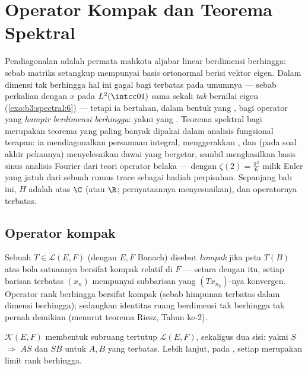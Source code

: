 \chapter{Operator Kompak dan Teorema Spektral}
\label{ch:b3:spectral}

Pendiagonalan adalah permata mahkota aljabar linear berdimensi
berhingga: sebab matriks setangkup mempunyai basis ortonormal berisi
vektor eigen. Dalam dimensi tak berhingga hal ini gagal bagi  terbatas pada umumnya --- sebab perkalian dengan $x$ pada
$L^2(\intcc01)$ sama sekali \emph{tak} bernilai eigen
(\cref{exo:b3:spectral:6}) --- tetapi ia bertahan, dalam bentuk
yang , bagi operator yang \emph{hampir berdimensi
berhingga}: yakni yang . Teorema spektral bagi
  merupakan teorema yang paling banyak dipakai
dalam analisis fungsional terapan: ia mendiagonalkan persamaan
integral, menggerakkan , dan (pada soal akhir
pekannya) menyelesaikan dawai yang bergetar, sambil menghasilkan basis sinus
analisis Fourier dari teori operator belaka --- dengan $\zeta(2) =
\frac{\pi^2}6$ milik Euler yang jatuh dari sebuah rumus trace sebagai
hadiah perpisahan. Sepanjang bab ini, $H$ adalah  atas $\C$ (atau
$\R$; pernyataannya menyesuaikan), dan operatornya terbatas.

\section{Operator kompak}

\begin{definition}\label{def:b3:spectral:compact}
Sebuah $T \in \mathcal L(E, F)$ (dengan $E, F$ Banach) disebut
\emph{kompak} jika peta $T(B)$ atas
bola satuannya bersifat kompak relatif di $F$ --- setara dengan itu,
setiap barisan terbatas $(x_n)$ mempunyai subbarisan yang
$(Tx_{n_k})$-nya konvergen. Operator rank berhingga bersifat kompak
(sebab himpunan terbatas dalam dimensi berhingga); sedangkan identitas ruang
berdimensi tak berhingga tak pernah demikian (menurut teorema Riesz, Tahun ke-2).
\end{definition}

\begin{proposition}\label{prop:b3:spectral:ideal}
 $\mathcal K(E, F)$ membentuk subruang tertutup
$\mathcal L(E, F)$, sekaligus  dua sisi: yakni $S$ 
$\Rightarrow$ $AS$ dan $SB$  untuk $A, B$ yang terbatas.
Lebih lanjut, pada , setiap  merupakan
limit  rank berhingga.
\end{proposition}

